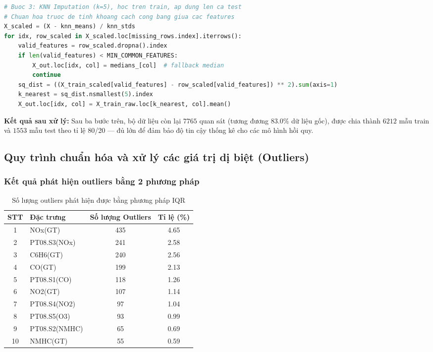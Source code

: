 \documentclass[12pt,a4paper]{report}
\newcommand{\theadcolor}{\rowcolor{tableheader}}
\begin{document}
\begin{lstlisting}[language=Python]
# Buoc 3: KNN Imputation (k=5), hoc tren train, ap dung len ca test
# Chuan hoa truoc de tinh khoang cach cong bang giua cac features
X_scaled = (X - knn_means) / knn_stds
for idx, row_scaled in X_scaled.loc[missing_rows.index].iterrows():
    valid_features = row_scaled.dropna().index
    if len(valid_features) < MIN_COMMON_FEATURES:
        X_out.loc[idx, col] = medians_[col]  # fallback median
        continue
    sq_dist = ((X_train_scaled[valid_features] - row_scaled[valid_features]) ** 2).sum(axis=1)
    k_nearest = sq_dist.nsmallest(5).index
    X_out.loc[idx, col] = X_train_raw.loc[k_nearest, col].mean()
\end{lstlisting}

\textbf{Kết quả sau xử lý:} Sau ba bước trên, bộ dữ liệu còn lại $7765$ quan sát (tương đương $83.0\%$ dữ liệu gốc), được chia thành $6212$ mẫu train và $1553$ mẫu test theo tỉ lệ 80/20 --- đủ lớn để đảm bảo độ tin cậy thống kê cho các mô hình hồi quy.

\subsection{Quy trình chuẩn hóa và xử lý các giá trị dị biệt (Outliers)}

\subsubsection{Kết quả phát hiện outliers bằng 2 phương pháp}
 
\begin{center}
\begin{table}[H]
\centering
\caption{Số lượng outliers phát hiện được bằng phương pháp IQR}
\label{table:outliers_iqr}
\begin{tabular}{|c|l|c|c|}
\hline
\theadcolor \textbf{STT} & \textbf{Đặc trưng} & \textbf{Số lượng Outliers} & \textbf{Tỉ lệ (\%)} \\
\hline
1 & NOx(GT) & 435 & 4.65 \\
\hline
2 & PT08.S3(NOx) & 241 & 2.58 \\
\hline
3 & C6H6(GT) & 240 & 2.56 \\
\hline
4 & CO(GT) & 199 & 2.13 \\
\hline
5 & PT08.S1(CO) & 118 & 1.26 \\
\hline
6 & NO2(GT) & 107 & 1.14 \\
\hline
7 & PT08.S4(NO2) & 97 & 1.04 \\
\hline
8 & PT08.S5(O3) & 93 & 0.99 \\
\hline
9 & PT08.S2(NMHC) & 65 & 0.69 \\
\hline
10 & NMHC(GT) & 55 & 0.59 \\
\hline
\end{tabular}
\end{table}
\end{center}
 
\end{document}
